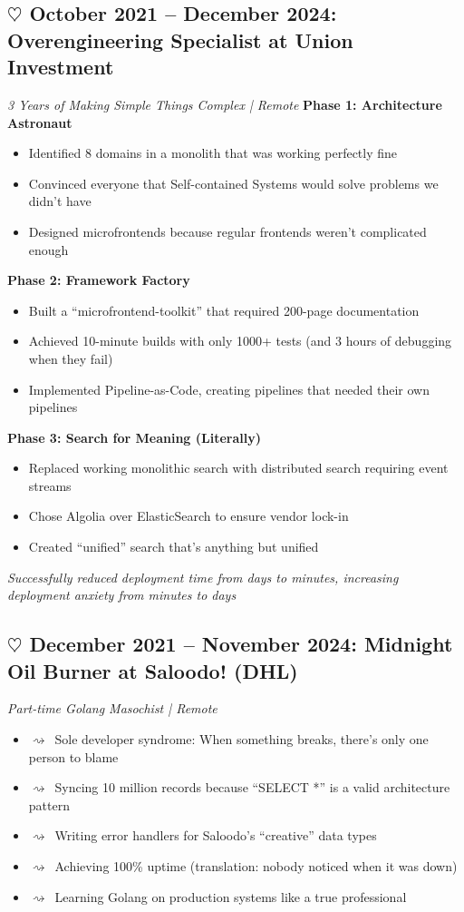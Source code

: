 \documentclass[11pt,a4paper]{article}
\newcommand{\heartstab}{{\color{heartcolor}$\heartsuit$}}
\newcommand{\squigglearrow}{{\color{squigglecolor}$\rightsquigarrow$}}
\begin{document}
\subsection{\texorpdfstring{\heartstab}{} October 2021 -- December 2024: Overengineering Specialist at Union Investment}
\textit{3 Years of Making Simple Things Complex | Remote}
\textbf{Phase 1: Architecture Astronaut}
\begin{itemize}[leftmargin=*,itemsep=0pt]
    \item Identified 8 domains in a monolith that was working perfectly fine
    \item Convinced everyone that Self-contained Systems would solve problems we didn't have
    \item Designed microfrontends because regular frontends weren't complicated enough
\end{itemize}
\textbf{Phase 2: Framework Factory}
\begin{itemize}[leftmargin=*,itemsep=0pt]
    \item Built a ``microfrontend-toolkit'' that required 200-page documentation
    \item Achieved 10-minute builds with only 1000+ tests (and 3 hours of debugging when they fail)
    \item Implemented Pipeline-as-Code, creating pipelines that needed their own pipelines
\end{itemize}
\textbf{Phase 3: Search for Meaning (Literally)}
\begin{itemize}[leftmargin=*,itemsep=0pt]
    \item Replaced working monolithic search with distributed search requiring event streams
    \item Chose Algolia over ElasticSearch to ensure vendor lock-in
    \item Created ``unified'' search that's anything but unified
\end{itemize}
\textit{Successfully reduced deployment time from days to minutes, increasing deployment anxiety from minutes to days}
\subsection{\texorpdfstring{\heartstab}{} December 2021 -- November 2024: Midnight Oil Burner at Saloodo! (DHL)}
\textit{Part-time Golang Masochist | Remote}
\begin{itemize}[leftmargin=*,itemsep=0pt]
    \item \squigglearrow\ Sole developer syndrome: When something breaks, there's only one person to blame
    \item \squigglearrow\ Syncing 10 million records because ``SELECT *'' is a valid architecture pattern
    \item \squigglearrow\ Writing error handlers for Saloodo's ``creative'' data types
    \item \squigglearrow\ Achieving 100\% uptime (translation: nobody noticed when it was down)
    \item \squigglearrow\ Learning Golang on production systems like a true professional
\end{itemize}
\end{document}
